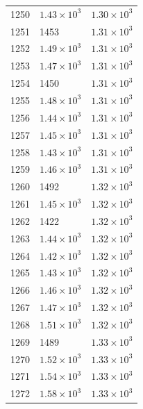 \begin{table}[H]
\begin{tabular}{lll}
1250 & $\displaystyle 1.43 \times 10^{3}$ & $\displaystyle 1.30 \times 10^{3}$ \\
1251 & 1453 & $\displaystyle 1.31 \times 10^{3}$ \\
1252 & $\displaystyle 1.49 \times 10^{3}$ & $\displaystyle 1.31 \times 10^{3}$ \\
1253 & $\displaystyle 1.47 \times 10^{3}$ & $\displaystyle 1.31 \times 10^{3}$ \\
1254 & 1450 & $\displaystyle 1.31 \times 10^{3}$ \\
1255 & $\displaystyle 1.48 \times 10^{3}$ & $\displaystyle 1.31 \times 10^{3}$ \\
1256 & $\displaystyle 1.44 \times 10^{3}$ & $\displaystyle 1.31 \times 10^{3}$ \\
1257 & $\displaystyle 1.45 \times 10^{3}$ & $\displaystyle 1.31 \times 10^{3}$ \\
1258 & $\displaystyle 1.43 \times 10^{3}$ & $\displaystyle 1.31 \times 10^{3}$ \\
1259 & $\displaystyle 1.46 \times 10^{3}$ & $\displaystyle 1.31 \times 10^{3}$ \\
1260 & 1492 & $\displaystyle 1.32 \times 10^{3}$ \\
1261 & $\displaystyle 1.45 \times 10^{3}$ & $\displaystyle 1.32 \times 10^{3}$ \\
1262 & 1422 & $\displaystyle 1.32 \times 10^{3}$ \\
1263 & $\displaystyle 1.44 \times 10^{3}$ & $\displaystyle 1.32 \times 10^{3}$ \\
1264 & $\displaystyle 1.42 \times 10^{3}$ & $\displaystyle 1.32 \times 10^{3}$ \\
1265 & $\displaystyle 1.43 \times 10^{3}$ & $\displaystyle 1.32 \times 10^{3}$ \\
1266 & $\displaystyle 1.46 \times 10^{3}$ & $\displaystyle 1.32 \times 10^{3}$ \\
1267 & $\displaystyle 1.47 \times 10^{3}$ & $\displaystyle 1.32 \times 10^{3}$ \\
1268 & $\displaystyle 1.51 \times 10^{3}$ & $\displaystyle 1.32 \times 10^{3}$ \\
1269 & 1489 & $\displaystyle 1.33 \times 10^{3}$ \\
1270 & $\displaystyle 1.52 \times 10^{3}$ & $\displaystyle 1.33 \times 10^{3}$ \\
1271 & $\displaystyle 1.54 \times 10^{3}$ & $\displaystyle 1.33 \times 10^{3}$ \\
1272 & $\displaystyle 1.58 \times 10^{3}$ & $\displaystyle 1.33 \times 10^{3}$ \\

\end{tabular}
\end{table}

